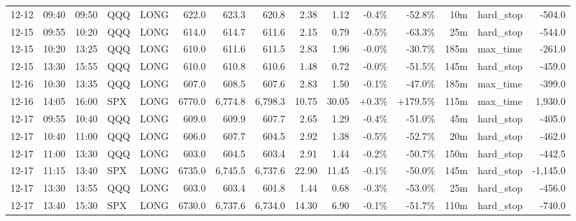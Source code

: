 \documentclass[11pt,a4paper,twoside]{article}
\begin{document}
\begin{landscape}
\begin{center}
\begin{longtable}{>{\color{txtmain}}l l l l l r r r r r r r r >{\color{txtmain}}l r}
12-12 & 09:40 & 09:50 & QQQ & LONG & 622.0 & 623.3 & 620.8 & 2.38 & 1.12 & \textcolor{lossred}{-0.4\%} & \textcolor{lossred}{-52.8\%} & 10m & hard\_stop & \textcolor{lossred}{-504.0} \\
12-15 & 09:55 & 10:20 & QQQ & LONG & 614.0 & 614.7 & 611.6 & 2.15 & 0.79 & \textcolor{lossred}{-0.5\%} & \textcolor{lossred}{-63.3\%} & 25m & hard\_stop & \textcolor{lossred}{-544.0} \\
12-15 & 10:20 & 13:25 & QQQ & LONG & 610.0 & 611.6 & 611.5 & 2.83 & 1.96 & \textcolor{lossred}{-0.0\%} & \textcolor{lossred}{-30.7\%} & 185m & max\_time & \textcolor{lossred}{-261.0} \\
12-15 & 13:30 & 15:55 & QQQ & LONG & 610.0 & 610.8 & 610.6 & 1.48 & 0.72 & \textcolor{lossred}{-0.0\%} & \textcolor{lossred}{-51.5\%} & 145m & hard\_stop & \textcolor{lossred}{-459.0} \\
12-16 & 10:30 & 13:35 & QQQ & LONG & 607.0 & 608.5 & 607.6 & 2.83 & 1.50 & \textcolor{lossred}{-0.1\%} & \textcolor{lossred}{-47.0\%} & 185m & max\_time & \textcolor{lossred}{-399.0} \\
12-16 & 14:05 & 16:00 & SPX & LONG & 6770.0 & 6,774.8 & 6,798.3 & 10.75 & 30.05 & \textcolor{wingreen}{+0.3\%} & \textcolor{wingreen}{+179.5\%} & 115m & max\_time & \textcolor{wingreen}{1,930.0} \\
12-17 & 09:55 & 10:40 & QQQ & LONG & 609.0 & 609.9 & 607.7 & 2.65 & 1.29 & \textcolor{lossred}{-0.4\%} & \textcolor{lossred}{-51.0\%} & 45m & hard\_stop & \textcolor{lossred}{-405.0} \\
12-17 & 10:40 & 11:00 & QQQ & LONG & 606.0 & 607.7 & 604.5 & 2.92 & 1.38 & \textcolor{lossred}{-0.5\%} & \textcolor{lossred}{-52.7\%} & 20m & hard\_stop & \textcolor{lossred}{-462.0} \\
12-17 & 11:00 & 13:30 & QQQ & LONG & 603.0 & 604.5 & 603.4 & 2.91 & 1.44 & \textcolor{lossred}{-0.2\%} & \textcolor{lossred}{-50.7\%} & 150m & hard\_stop & \textcolor{lossred}{-442.5} \\
12-17 & 11:15 & 13:40 & SPX & LONG & 6735.0 & 6,745.5 & 6,737.6 & 22.90 & 11.45 & \textcolor{lossred}{-0.1\%} & \textcolor{lossred}{-50.0\%} & 145m & hard\_stop & \textcolor{lossred}{-1,145.0} \\
12-17 & 13:30 & 13:55 & QQQ & LONG & 603.0 & 603.4 & 601.8 & 1.44 & 0.68 & \textcolor{lossred}{-0.3\%} & \textcolor{lossred}{-53.0\%} & 25m & hard\_stop & \textcolor{lossred}{-456.0} \\
12-17 & 13:40 & 15:30 & SPX & LONG & 6730.0 & 6,737.6 & 6,734.0 & 14.30 & 6.90 & \textcolor{lossred}{-0.1\%} & \textcolor{lossred}{-51.7\%} & 110m & hard\_stop & \textcolor{lossred}{-740.0} \\

\end{longtable}
\end{center}
\end{landscape}
\end{document}
